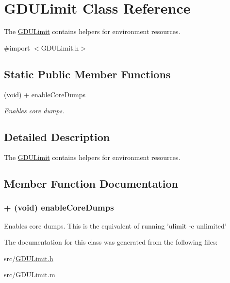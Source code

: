 \hypertarget{interface_g_d_u_limit}{
\section{GDULimit Class Reference}
\label{interface_g_d_u_limit}
}


The \hyperlink{interface_g_d_u_limit}{GDULimit} contains helpers for environment resources.  


{\ttfamily \#import $<$GDULimit.h$>$}\subsection*{Static Public Member Functions}
\begin{DoxyCompactItemize}
\item 
(void) + \hyperlink{interface_g_d_u_limit_ab657cde9b16d4cb6f5b77fd96fe917e0}{enableCoreDumps}
\begin{DoxyCompactList}\small\item\em Enables core dumps. \item\end{DoxyCompactList}\end{DoxyCompactItemize}


\subsection{Detailed Description}
The \hyperlink{interface_g_d_u_limit}{GDULimit} contains helpers for environment resources. 

\subsection{Member Function Documentation}
\hypertarget{interface_g_d_u_limit_ab657cde9b16d4cb6f5b77fd96fe917e0}{
\subsubsection[{enableCoreDumps}]{\setlength{\rightskip}{0pt plus 5cm}+ (void) enableCoreDumps }}
\label{interface_g_d_u_limit_ab657cde9b16d4cb6f5b77fd96fe917e0}


Enables core dumps. This is the equivalent of running 'ulimit -\/c unlimited' 

The documentation for this class was generated from the following files:\begin{DoxyCompactItemize}
\item 
src/\hyperlink{_g_d_u_limit_8h}{GDULimit.h}\item 
src/GDULimit.m\end{DoxyCompactItemize}
